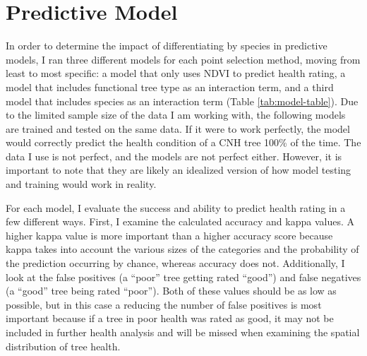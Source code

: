 \documentclass[12pt,twoside]{reedthesis}
\begin{document}
\hypertarget{predictive-model}{%
\section{Predictive Model}\label{predictive-model}}

In order to determine the impact of differentiating by species in predictive models, I ran three different models for each point selection method, moving from least to most specific: a model that only uses NDVI to predict health rating, a model that includes functional tree type as an interaction term, and a third model that includes species as an interaction term (Table \ref{tab:model-table}). Due to the limited sample size of the data I am working with, the following models are trained and tested on the same data. If it were to work perfectly, the model would correctly predict the health condition of a CNH tree 100\% of the time. The data I use is not perfect, and the models are not perfect either. However, it is important to note that they are likely an idealized version of how model testing and training would work in reality.

For each model, I evaluate the success and ability to predict health rating in a few different ways. First, I examine the calculated accuracy and kappa values. A higher kappa value is more important than a higher accuracy score because kappa takes into account the various sizes of the categories and the probability of the prediction occurring by chance, whereas accuracy does not. Additionally, I look at the false positives (a ``poor'' tree getting rated ``good'') and false negatives (a ``good'' tree being rated ``poor''). Both of these values should be as low as possible, but in this case a reducing the number of false positives is most important because if a tree in poor health was rated as good, it may not be included in further health analysis and will be missed when examining the spatial distribution of tree health.
\end{document}
